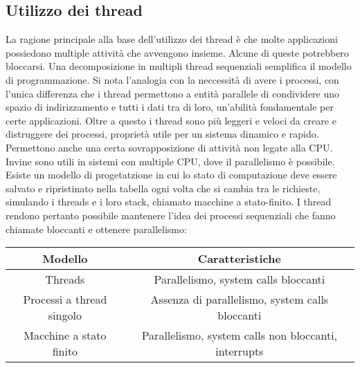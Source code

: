 \subsection{Utilizzo dei thread}
La ragione principale alla base dell'utilizzo dei thread \`e che molte applicazioni possiedono multiple attivit\`a che avvengono insieme. Alcune di queste potrebbero bloccarsi. Una
decomposizione in multipli thread sequenziali semplifica il modello di programmazione. Si nota l'analogia con la neccessit\`a di avere i processi, con l'unica differenza che i thread
permettono a entit\`a parallele di condividere uno spazio di indirizzamento e tutti i dati tra di loro, un'abilit\`a fondamentale per certe applicazioni. Oltre a questo i thread sono
pi\`u leggeri e veloci da creare e distruggere dei processi, propriet\`a utile per un sistema dinamico e rapido. Permettono anche una certa sovrapposizione di attivit\`a non legate alla
CPU. Invine sono utili in sistemi con multiple CPU, dove il parallelismo \`e possibile. Esiste un modello di progetatzione in cui lo stato di computazione deve essere salvato e
ripristinato nella tabella ogni volta che si cambia tra le richieste, simulando i threads e i loro stack, chiamato macchine a stato-finito. I thread rendono pertanto possibile mantenere
l'idea dei processi sequenziali che fanno chiamate bloccanti e ottenere parallelismo:\\
\begin{tabular}{|c|c|}
	\hline
	\textbf{Modello}          & \textbf{Caratteristiche}                             \\
	\hline
	Threads                   & Parallelismo, system calls bloccanti                 \\
	\hline
	Processi a thread singolo & Assenza di parallelismo, system calls bloccanti      \\
	\hline
	Macchine a stato finito   & Parallelismo, system calls non bloccanti, interrupts \\
	\hline
\end{tabular}

